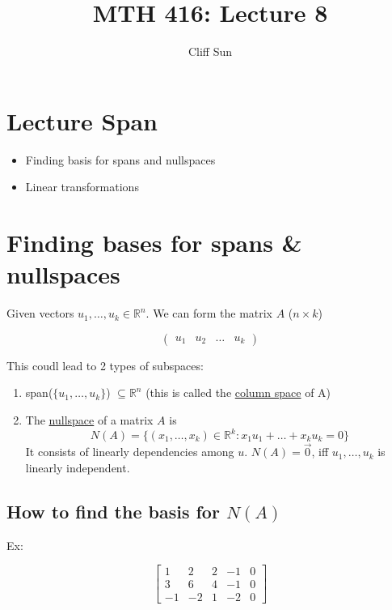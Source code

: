 \documentclass{article}
\title{MTH 416: Lecture 8}
\author{Cliff Sun}
\newtheorem{one minute paper}[theorem]{One Minute Paper}
\begin{document}
\maketitle

\section*{Lecture Span}
\begin{itemize}
    \item Finding basis for spans and nullspaces
    \item Linear transformations
\end{itemize}

\section*{Finding bases for spans \& nullspaces}

Given vectors $u_1, \dots, u_k \in \mathbb{R}^n$. We can form the matrix $A$ ($n \times k$)

\[\begin{pmatrix}
    u_1 & u_2 & \dots & u_k
\end{pmatrix}\]

This coudl lead to 2 types of subspaces:

\begin{enumerate}
    \item span($\{u_1, \dots, u_k\}$) $\subseteq \mathbb{R}^n$ (this is called the \underline{column space} of A)
    \item The \underline{nullspace} of a matrix $A$ is 
    \begin{equation}
        N(A) = \{(x_1, \dots, x_k) \in \mathbb{R}^k : x_1u_1 + \dots + x_ku_k = 0\}
    \end{equation} 
    It consists of linearly dependencies among $u$. $N(A) = \vec{0}$, iff $u_1, \dots, u_k$ is linearly independent. 
\end{enumerate}

\subsection*{How to find the basis for $N(A)$}

Ex:

\[\left[\begin{array}{cccc|c}
    1 & 2 & 2 & -1 & 0 \\
    3 & 6 & 4 & -1 & 0 \\
    -1 & -2 & 1 & -2 & 0
\end{array}\right]\]
\end{document}
